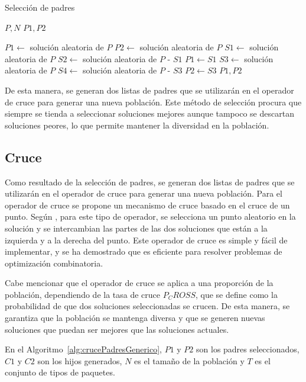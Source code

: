 \begin{algorithm}[H]
\caption{Selección de padres}\label{alg:seleccionPadres}
\begin{algorithmic}[1]
\Require $P, N$
\Ensure $P1, P2$

\State $P1 \leftarrow$ solución aleatoria de $P$
\State $P2 \leftarrow$ solución aleatoria de $P$
    \State $S1 \leftarrow$ solución aleatoria de $P$
    \State $S2 \leftarrow$ solución aleatoria de $P$ - $S1$
        \State $P1 \leftarrow S1$
    \EndIf
    \State $S3 \leftarrow$ solución aleatoria de $P$
    \State $S4 \leftarrow$ solución aleatoria de $P$ - $S3$
        \State $P2 \leftarrow S3$
    \EndIf
\EndFor
\State \Return $P1, P2$
\end{algorithmic}
\end{algorithm}

De esta manera, se generan dos listas de padres que se utilizarán en el operador de cruce para generar una nueva población. Este método de selección procura que siempre se tienda a seleccionar soluciones mejores aunque tampoco se descartan soluciones peores, lo que permite mantener la diversidad en la población.

\subsection{Cruce}

Como resultado de la selección de padres, se generan dos listas de padres que se utilizarán en el operador de cruce para generar una nueva población. Para el operador de cruce se propone un mecanismo de cruce basado en el cruce de un punto. Según \textcite{Umbarkar2015}, para este tipo de operador, se selecciona un punto aleatorio en la solución y se intercambian las partes de las dos soluciones que están a la izquierda y a la derecha del punto. Este operador de cruce es simple y fácil de implementar, y se ha demostrado que es eficiente para resolver problemas de optimización combinatoria.

Cabe mencionar que el operador de cruce se aplica a una proporción de la población, dependiendo de la tasa de cruce $P_CROSS$, que se define como la probabilidad de que dos soluciones seleccionadas se crucen. De esta manera, se garantiza que la población se mantenga diversa y que se generen nuevas soluciones que puedan ser mejores que las soluciones actuales.

En el Algoritmo~\ref{alg:crucePadresGenerico}, $P1$ y $P2$ son los padres seleccionados, $C1$ y $C2$ son los hijos generados, $N$ es el tamaño de la población y $T$ es el conjunto de tipos de paquetes.

